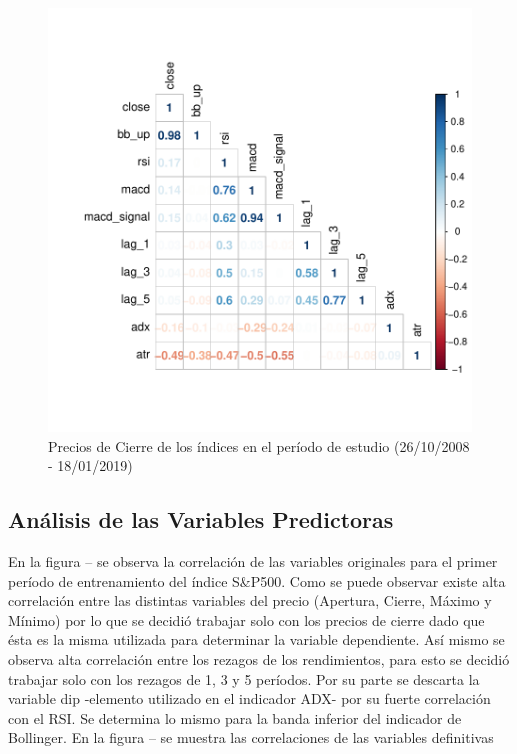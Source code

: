 \documentclass[a4paper,12pt]{Latex/Classes/PhDthesisPSnPDF}
\begin{document}
\begin{figure}[H]
\centering
\includegraphics{main-004}
\caption{Precios de Cierre de los índices en el período de estudio (26/10/2008 - 18/01/2019)}
\end{figure}


\subsection{Análisis de las Variables Predictoras}

En la figura -- se observa la correlación de las variables originales para el primer período de entrenamiento del índice S\&P500. Como se puede observar existe alta correlación entre las distintas variables del precio (Apertura, Cierre, Máximo y Mínimo) por lo que se decidió trabajar solo con los precios de cierre dado que ésta es la misma utilizada para determinar la variable dependiente. Así mismo se observa alta correlación entre los rezagos de los rendimientos, para esto se decidió trabajar solo con los rezagos de 1, 3 y 5 períodos. Por su parte se descarta la variable dip -elemento utilizado en el indicador ADX- por su fuerte correlación con el RSI. Se determina lo mismo para la banda inferior del indicador de Bollinger. En la figura -- se muestra las correlaciones de las variables definitivas
\end{document}
